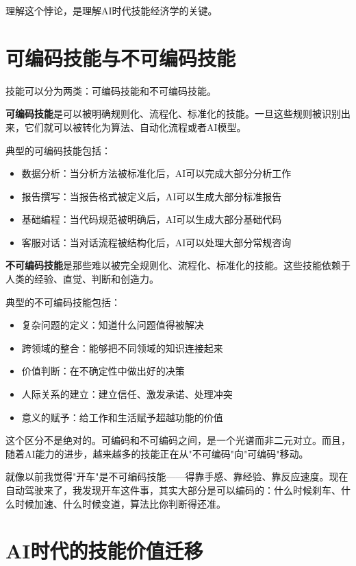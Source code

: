 理解这个悖论，是理解AI时代技能经济学的关键。

\section{可编码技能与不可编码技能}


技能可以分为两类：可编码技能和不可编码技能。

\textbf{可编码技能}是可以被明确规则化、流程化、标准化的技能。一旦这些规则被识别出来，它们就可以被转化为算法、自动化流程或者AI模型。

典型的可编码技能包括：

\begin{itemize}
\item 数据分析：当分析方法被标准化后，AI可以完成大部分分析工作
\item 报告撰写：当报告格式被定义后，AI可以生成大部分标准报告
\item 基础编程：当代码规范被明确后，AI可以生成大部分基础代码
\item 客服对话：当对话流程被结构化后，AI可以处理大部分常规咨询

\end{itemize}
\textbf{不可编码技能}是那些难以被完全规则化、流程化、标准化的技能。这些技能依赖于人类的经验、直觉、判断和创造力。

典型的不可编码技能包括：

\begin{itemize}
\item 复杂问题的定义：知道什么问题值得被解决
\item 跨领域的整合：能够把不同领域的知识连接起来
\item 价值判断：在不确定性中做出好的决策
\item 人际关系的建立：建立信任、激发承诺、处理冲突
\item 意义的赋予：给工作和生活赋予超越功能的价值

\end{itemize}
这个区分不是绝对的。可编码和不可编码之间，是一个光谱而非二元对立。而且，随着AI能力的进步，越来越多的技能正在从"不可编码"向"可编码"移动。

就像以前我觉得"开车"是不可编码技能——得靠手感、靠经验、靠反应速度。现在自动驾驶来了，我发现开车这件事，其实大部分是可以编码的：什么时候刹车、什么时候加速、什么时候变道，算法比你判断得还准。

\section{AI时代的技能价值迁移}


